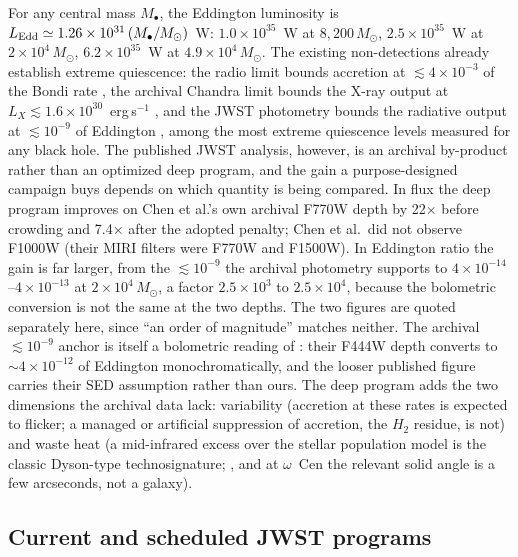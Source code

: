 \documentclass[11pt]{article}
\newcommand{\msun}{\ensuremath{M_\odot}}
\newcommand{\ocen}{\ensuremath{\omega}~Cen}
\begin{document}
For any central mass $M_{\bullet}$, the Eddington luminosity is $L_{\rm Edd} \simeq 1.26\times10^{31}\,(M_{\bullet}/\msun)$~W: $1.0\times10^{35}$~W at $8{,}200\,\msun$, $2.5\times10^{35}$~W at $2\times10^{4}\,\msun$, $6.2\times10^{35}$~W at $4.9\times10^{4}\,\msun$. The existing non-detections already establish extreme quiescence: the radio limit bounds accretion at $\lesssim 4\times10^{-3}$ of the Bondi rate \citep{Mahida2026}, the archival Chandra limit bounds the X-ray output at $L_X \lesssim 1.6\times10^{30}$~erg\,s$^{-1}$ \citep{Haggard2013}, and the JWST photometry bounds the radiative output at $\lesssim 10^{-9}$ of Eddington \citep{Chen2025JWST}, among the most extreme quiescence levels measured for any black hole. The published JWST analysis, however, is an archival by-product rather than an optimized deep program, and the gain a purpose-designed campaign buys depends on which quantity is being compared. In flux the deep program improves on Chen et al.'s own archival F770W depth by 22$\times$ before crowding and 7.4$\times$ after the adopted penalty; Chen et al.\ did not observe F1000W (their MIRI filters were F770W and F1500W). In Eddington ratio the gain is far larger, from the $\lesssim 10^{-9}$ the archival photometry supports to $4\times10^{-14}$--$4\times10^{-13}$ at $2\times10^{4}\,\msun$, a factor $2.5\times10^{3}$ to $2.5\times10^{4}$, because the bolometric conversion is not the same at the two depths. The two figures are quoted separately here, since ``an order of magnitude'' matches neither. The archival $\lesssim 10^{-9}$ anchor is itself a bolometric reading of \citet{Chen2025JWST}: their F444W depth converts to $\sim$$4\times10^{-12}$ of Eddington monochromatically, and the looser published figure carries their SED assumption rather than ours. The deep program adds the two dimensions the archival data lack: variability (accretion at these rates is expected to flicker; a managed or artificial suppression of accretion, the $H_2$ residue, is not) and waste heat (a mid-infrared excess over the stellar population model is the classic Dyson-type technosignature; \citealt{Dyson1960,Wright2014,Hsiao2021}, and at \ocen{} the relevant solid angle is a few arcseconds, not a galaxy).

\subsection{Current and scheduled JWST programs}
\label{sec:jwstexisting}
\end{document}
